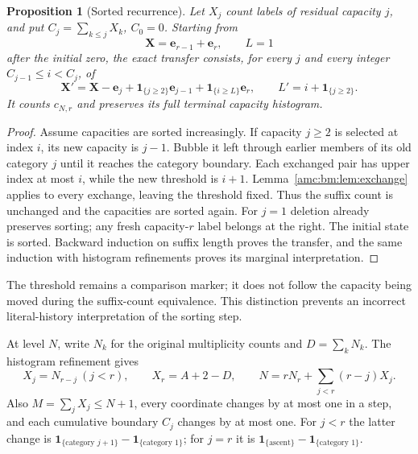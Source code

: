 \documentclass[11pt,letterpaper]{article}
\newtheorem{proposition}[theorem]{Proposition}
\theoremstyle{remark}\newtheorem{remark}[theorem]{Remark}
\newcommand{\ind}[1]{\mathbf1_{\{#1\}}}
\newcommand{\bX}{\boldsymbol X}
\begin{document}
\begin{proposition}[Sorted recurrence]\label{amc:bm:prop:recurrence}
Let $X_j$ count labels of residual capacity $j$, and put $C_j=\sum_{k\le j}X_k$, $C_0=0$. Starting from
\[
 \bX=\boldsymbol e_{r-1}+\boldsymbol e_r,\qquad L=1
\]
after the initial zero, the exact transfer consists, for every $j$ and every integer $C_{j-1}\le i<C_j$, of
\begin{equation}\label{amc:bm:eq:transfer}
 \bX'=\bX-\boldsymbol e_j+\ind{j\ge2}\boldsymbol e_{j-1}
       +\ind{i\ge L}\boldsymbol e_r,
 \qquad L'=i+\ind{j\ge2}.
\end{equation}
It counts $c_{N,r}$ and preserves its full terminal capacity histogram.
\end{proposition}
\begin{proof}
Assume capacities are sorted increasingly. If capacity $j\ge2$ is selected at index $i$, its new capacity is $j-1$. Bubble it left through earlier members of its old category $j$ until it reaches the category boundary. Each exchanged pair has upper index at most $i$, while the new threshold is $i+1$. Lemma~\ref{amc:bm:lem:exchange} applies to every exchange, leaving the threshold fixed. Thus the suffix count is unchanged and the capacities are sorted again. For $j=1$ deletion already preserves sorting; any fresh capacity-$r$ label belongs at the right. The initial state is sorted. Backward induction on suffix length proves the transfer, and the same induction with histogram refinements proves its marginal interpretation.
\end{proof}

The threshold remains a comparison marker; it does not follow the capacity being moved during the suffix-count equivalence. This distinction prevents an incorrect literal-history interpretation of the sorting step.

At level $N$, write $N_k$ for the original multiplicity counts and $D=\sum_kN_k$. The histogram refinement gives
\begin{equation}\label{amc:bm:eq:histrelations}
 X_j=N_{r-j}\ (j<r),\qquad X_r=A+2-D,
 \qquad N=rN_r+\sum_{j<r}(r-j)X_j.
\end{equation}
Also $M=\sum_jX_j\le N+1$, every coordinate changes by at most one in a step, and each cumulative boundary $C_j$ changes by at most one. For $j<r$ the latter change is $\ind{\text{category }j+1}-\ind{\text{category }1}$; for $j=r$ it is $\ind{\text{ascent}}-\ind{\text{category }1}$.
\end{document}
